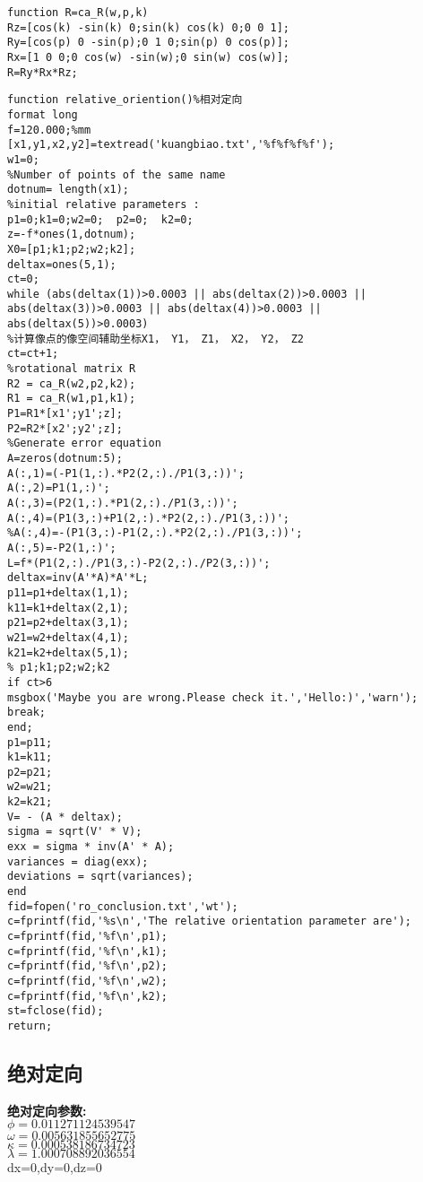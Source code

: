\begin{lstlisting}[caption=ca\_R.m文件]
function R=ca_R(w,p,k)
Rz=[cos(k) -sin(k) 0;sin(k) cos(k) 0;0 0 1];
Ry=[cos(p) 0 -sin(p);0 1 0;sin(p) 0 cos(p)];
Rx=[1 0 0;0 cos(w) -sin(w);0 sin(w) cos(w)];
R=Ry*Rx*Rz;
\end{lstlisting}

\begin{lstlisting}[caption=relative\_oriention.m文件]
function relative_oriention()%相对定向
format long
f=120.000;%mm
[x1,y1,x2,y2]=textread('kuangbiao.txt','%f%f%f%f');
w1=0;
%Number of points of the same name
dotnum= length(x1); 
%initial relative parameters :
p1=0;k1=0;w2=0;  p2=0;  k2=0; 
z=-f*ones(1,dotnum);
X0=[p1;k1;p2;w2;k2];
deltax=ones(5,1);
ct=0;
while (abs(deltax(1))>0.0003 || abs(deltax(2))>0.0003 || abs(deltax(3))>0.0003 || abs(deltax(4))>0.0003 || abs(deltax(5))>0.0003)
%计算像点的像空间辅助坐标X1， Y1， Z1， X2， Y2， Z2
ct=ct+1;
%rotational matrix R
R2 = ca_R(w2,p2,k2);
R1 = ca_R(w1,p1,k1);
P1=R1*[x1';y1';z];
P2=R2*[x2';y2';z];
%Generate error equation
A=zeros(dotnum:5);
A(:,1)=(-P1(1,:).*P2(2,:)./P1(3,:))';
A(:,2)=P1(1,:)';
A(:,3)=(P2(1,:).*P1(2,:)./P1(3,:))';
A(:,4)=(P1(3,:)+P1(2,:).*P2(2,:)./P1(3,:))';
%A(:,4)=-(P1(3,:)-P1(2,:).*P2(2,:)./P1(3,:))';
A(:,5)=-P2(1,:)';
L=f*(P1(2,:)./P1(3,:)-P2(2,:)./P2(3,:))';
deltax=inv(A'*A)*A'*L;
p11=p1+deltax(1,1);
k11=k1+deltax(2,1);
p21=p2+deltax(3,1);
w21=w2+deltax(4,1);
k21=k2+deltax(5,1);
% p1;k1;p2;w2;k2
if ct>6
msgbox('Maybe you are wrong.Please check it.','Hello:)','warn');
break;
end;
p1=p11;
k1=k11;
p2=p21;
w2=w21;
k2=k21;
V= - (A * deltax);
sigma = sqrt(V' * V);
exx = sigma * inv(A' * A);
variances = diag(exx);
deviations = sqrt(variances);
end
fid=fopen('ro_conclusion.txt','wt');
c=fprintf(fid,'%s\n','The relative orientation parameter are');
c=fprintf(fid,'%f\n',p1);
c=fprintf(fid,'%f\n',k1);
c=fprintf(fid,'%f\n',p2);
c=fprintf(fid,'%f\n',w2);
c=fprintf(fid,'%f\n',k2);
st=fclose(fid);
return;
\end{lstlisting}

\subsection{绝对定向}
\textbf{绝对定向参数:}\\
$\phi=0.011271124539547$  \\
$\omega=0.005631855652775$\\  
$\kappa=0.000538186734723$ \\
$\lambda=1.000708892036554$ \\
dx=0,\quad dy=0,\quad dz=0  

